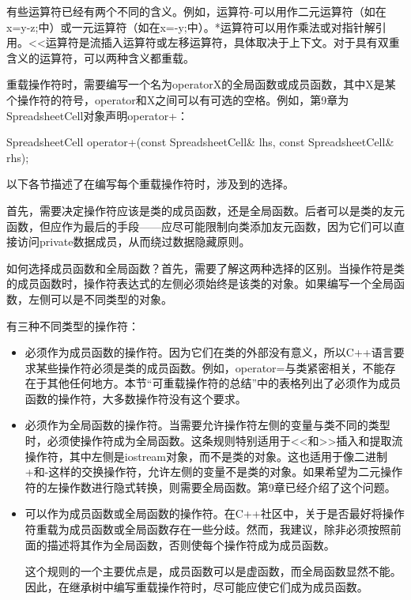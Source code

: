 有些运算符已经有两个不同的含义。例如，运算符-可以用作二元运算符（如在x=y-z;中）或一元运算符（如在x=-y;中）。*运算符可以用作乘法或对指针解引用。<{}<运算符是流插入运算符或左移运算符，具体取决于上下文。对于具有双重含义的运算符，可以两种含义都重载。


重载操作符时，需要编写一个名为operatorX的全局函数或成员函数，其中X是某个操作符的符号，operator和X之间可以有可选的空格。例如，第9章为SpreadsheetCell对象声明operator+：

\begin{cpp}
SpreadsheetCell operator+(const SpreadsheetCell& lhs, const SpreadsheetCell& rhs);
\end{cpp}

以下各节描述了在编写每个重载操作符时，涉及到的选择。


首先，需要决定操作符应该是类的成员函数，还是全局函数。后者可以是类的友元函数，但应作为最后的手段——应尽可能限制向类添加友元函数，因为它们可以直接访问private数据成员，从而绕过数据隐藏原则。

如何选择成员函数和全局函数？首先，需要了解这两种选择的区别。当操作符是类的成员函数时，操作符表达式的左侧必须始终是该类的对象。如果编写一个全局函数，左侧可以是不同类型的对象。

有三种不同类型的操作符：

\begin{itemize}
\item
必须作为成员函数的操作符。因为它们在类的外部没有意义，所以C++语言要求某些操作符必须是类的成员函数。例如，operator=与类紧密相关，不能存在于其他任何地方。本节“可重载操作符的总结”中的表格列出了必须作为成员函数的操作符，大多数操作符没有这个要求。

\item
必须作为全局函数的操作符。当需要允许操作符左侧的变量与类不同的类型时，必须使操作符成为全局函数。这条规则特别适用于<{}<和>{>}插入和提取流操作符，其中左侧是iostream对象，而不是类的对象。这也适用于像二进制+和-这样的交换操作符，允许左侧的变量不是类的对象。如果希望为二元操作符的左操作数进行隐式转换，则需要全局函数。第9章已经介绍了这个问题。

\item
可以作为成员函数或全局函数的操作符。在C++社区中，关于是否最好将操作符重载为成员函数或全局函数存在一些分歧。然而，我建议，除非必须按照前面的描述将其作为全局函数，否则使每个操作符成为成员函数。

这个规则的一个主要优点是，成员函数可以是虚函数，而全局函数显然不能。因此，在继承树中编写重载操作符时，尽可能应使它们成为成员函数。
\end{itemize}

